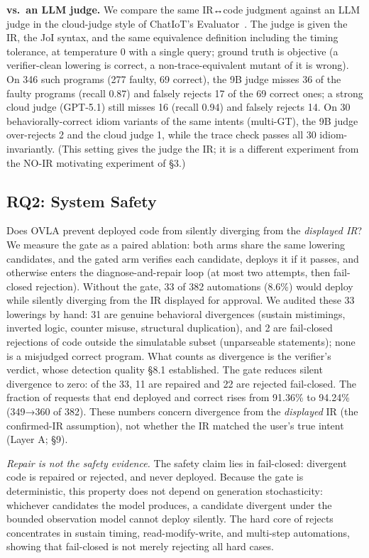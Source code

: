 \documentclass[sigconf,nonacm,anonymous,review]{acmart}
\begin{document}
\textbf{vs.\ an LLM judge.} We compare the same IR↔code judgment against an LLM judge in the cloud-judge style of ChatIoT's Evaluator~\cite{chatiot}. The judge is given the IR, the JoI syntax, and the same equivalence definition including the timing tolerance, at temperature 0 with a single query; ground truth is objective (a verifier-clean lowering is correct, a non-trace-equivalent mutant of it is wrong). On 346 such programs (277 faulty, 69 correct), the 9B judge misses 36 of the faulty programs (recall 0.87) and falsely rejects 17 of the 69 correct ones; a strong cloud judge (GPT-5.1) still misses 16 (recall 0.94) and falsely rejects 14. On 30 behaviorally-correct idiom variants of the same intents (multi-GT), the 9B judge over-rejects 2 and the cloud judge 1, while the trace check passes all 30 idiom-invariantly. (This setting gives the judge the IR; it is a different experiment from the NO-IR motivating experiment of \S3.)

\subsection{RQ2: System Safety}

Does OVLA prevent deployed code from silently diverging from the \emph{displayed IR}? We measure the gate as a paired ablation: both arms share the same lowering candidates, and the gated arm verifies each candidate, deploys it if it passes, and otherwise enters the diagnose-and-repair loop (at most two attempts, then fail-closed rejection). Without the gate, 33 of 382 automations (8.6\%) would deploy while silently diverging from the IR displayed for approval. We audited these 33 lowerings by hand: 31 are genuine behavioral divergences (sustain mistimings, inverted logic, counter misuse, structural duplication), and 2 are fail-closed rejections of code outside the simulatable subset (unparseable statements); none is a misjudged correct program. What counts as divergence is the verifier's verdict, whose detection quality \S8.1 established. The gate reduces silent divergence to zero: of the 33, 11 are repaired and 22 are rejected fail-closed. The fraction of requests that end deployed and correct rises from 91.36\% to 94.24\% (349→360 of 382). These numbers concern divergence from the \emph{displayed} IR (the confirmed-IR assumption), not whether the IR matched the user's true intent (Layer A; \S9).

\emph{Repair is not the safety evidence.} The safety claim lies in fail-closed: divergent code is repaired or rejected, and never deployed. Because the gate is deterministic, this property does not depend on generation stochasticity: whichever candidates the model produces, a candidate divergent under the bounded observation model cannot deploy silently. The hard core of rejects concentrates in sustain timing, read-modify-write, and multi-step automations, showing that fail-closed is not merely rejecting all hard cases.
\end{document}
